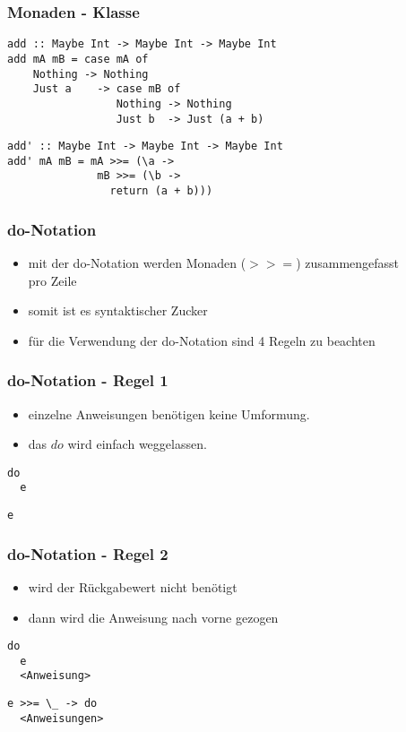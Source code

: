 \begin{frame}[fragile]
\frametitle{Monaden - Klasse}
\begin{lstlisting}
add :: Maybe Int -> Maybe Int -> Maybe Int
add mA mB = case mA of
    Nothing -> Nothing
    Just a    -> case mB of
                 Nothing -> Nothing
                 Just b  -> Just (a + b)
\end{lstlisting}	
\pause
\begin{lstlisting}
add' :: Maybe Int -> Maybe Int -> Maybe Int
add' mA mB = mA >>= (\a ->
              mB >>= (\b ->
                return (a + b)))
\end{lstlisting}	
\end{frame}

\begin{frame}
\frametitle{do-Notation}
\begin{itemize}
\item mit der do-Notation werden Monaden ($>>=$) zusammengefasst \\ pro Zeile
\item somit ist es syntaktischer Zucker
\item für die Verwendung der do-Notation sind 4 Regeln zu beachten
\end{itemize}
\end{frame}

\begin{frame}[fragile]
\frametitle{do-Notation - Regel 1}
\begin{itemize}
\item einzelne Anweisungen benötigen keine Umformung.
\item das $do$ wird einfach weggelassen.
\end{itemize}
\begin{lstlisting}
do 
  e
\end{lstlisting}	
\pause
\begin{lstlisting}
e
\end{lstlisting}	
\end{frame}

\begin{frame}[fragile]
\frametitle{do-Notation - Regel 2}
\begin{itemize}
\item wird der Rückgabewert nicht benötigt
\item dann wird die Anweisung nach vorne gezogen
\end{itemize}
\begin{lstlisting}
do 
  e
  <Anweisung>
\end{lstlisting}	
\pause
\begin{lstlisting}
e >>= \_ -> do
  <Anweisungen>
\end{lstlisting}	
\end{frame}

